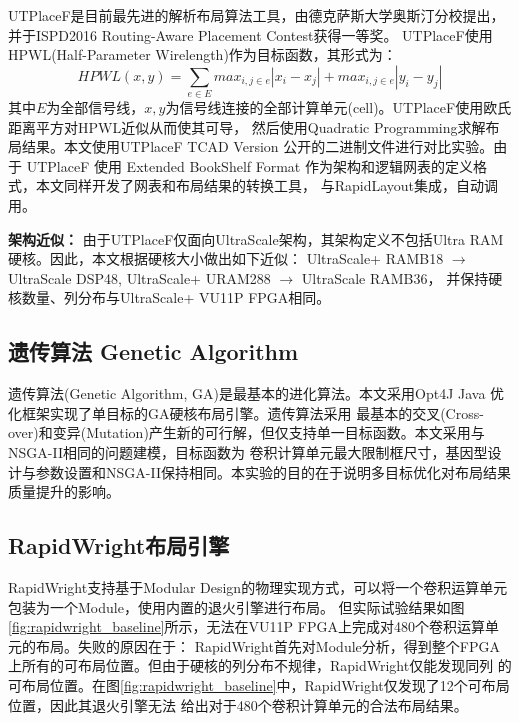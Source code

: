 UTPlaceF是目前最先进的解析布局算法工具，由德克萨斯大学奥斯汀分校提出，并于ISPD2016 Routing-Aware Placement Contest获得一等奖。
UTPlaceF使用HPWL(Half-Parameter Wirelength)作为目标函数，其形式为：
$$ HPWL(x,y) = \sum_{e \in E} {max_{i,j \in e} |x_i-x_j| + max_{i,j \in e} |y_i-y_j|} $$
其中$E$为全部信号线，$x, y$为信号线连接的全部计算单元(cell)。UTPlaceF使用欧氏距离平方对HPWL近似从而使其可导，
然后使用Quadratic Programming求解布局结果。本文使用UTPlaceF TCAD Version 公开的二进制文件进行对比实验。由于
UTPlaceF 使用 Extended BookShelf Format 作为架构和逻辑网表的定义格式，本文同样开发了网表和布局结果的转换工具，
与RapidLayout集成，自动调用。

{\bf 架构近似：} 由于UTPlaceF仅面向UltraScale架构，其架构定义不包括Ultra RAM硬核。因此，本文根据硬核大小做出如下近似：
UltraScale+ RAMB18 $\rightarrow$ UltraScale DSP48, 
UltraScale+ URAM288 $\rightarrow$ UltraScale RAMB36，
并保持硬核数量、列分布与UltraScale+ VU11P FPGA相同。

\subsection{遗传算法 Genetic Algorithm}

遗传算法(Genetic Algorithm, GA)是最基本的进化算法。本文采用Opt4J Java 优化框架实现了单目标的GA硬核布局引擎。遗传算法采用
最基本的交叉(Cross-over)和变异(Mutation)产生新的可行解，但仅支持单一目标函数。本文采用与NSGA-II相同的问题建模，目标函数为
卷积计算单元最大限制框尺寸，基因型设计与参数设置和NSGA-II保持相同。本实验的目的在于说明多目标优化对布局结果质量提升的影响。

\subsection{RapidWright布局引擎}

RapidWright支持基于Modular Design的物理实现方式，可以将一个卷积运算单元包装为一个Module，使用内置的退火引擎进行布局。
但实际试验结果如图\ref{fig:rapidwright_baseline}所示，无法在VU11P FPGA上完成对480个卷积运算单元的布局。失败的原因在于：
RapidWright首先对Module分析，得到整个FPGA上所有的可布局位置。但由于硬核的列分布不规律，RapidWright仅能发现同列
的可布局位置。在图\ref{fig:rapidwright_baseline}中，RapidWright仅发现了12个可布局位置，因此其退火引擎无法
给出对于480个卷积计算单元的合法布局结果。

